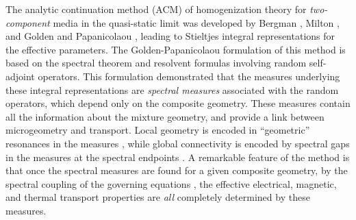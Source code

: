 \documentclass{cmslatex}
\begin{document}
The analytic continuation method (ACM) of homogenization theory
for \emph{two-component} media in the
quasi-static limit was developed by Bergman \cite{Bergman:PRL-1285},
Milton \cite{Milton:APL-300}, and Golden and Papanicolaou
\cite{Golden:CMP-473},
leading to Stieltjes integral representations for the effective
parameters.  The Golden-Papanicolaou formulation of this
method is based on the spectral theorem
and resolvent formulas involving random self-adjoint operators. This
formulation demonstrated that the measures underlying 
these integral representations are \emph{spectral measures} associated
with the random operators, which depend only on the composite
geometry. These measures contain all the information about the mixture
geometry, and provide a link between microgeometry and
transport. Local geometry is encoded in ``geometric'' resonances in
the measures \cite{Jonckheere_Luck_JPA_1998}, while global
connectivity is encoded by spectral gaps in the measures at the
spectral endpoints
\cite{Murphy:JMP:063506,Jonckheere_Luck_JPA_1998}. A remarkable
feature of the method is that once the spectral measures are found for
a given composite geometry, by the spectral coupling of the governing
equations
\cite{Cherkaeva:IP-1203,MILTON:2002:TC,Cherkaev:2004:331,Cherkaev:PBCM:0921},
the effective electrical, magnetic, and thermal transport properties
are \emph{all} completely determined by these measures.
\end{document}
